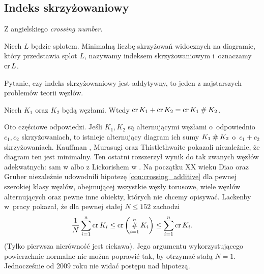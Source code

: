 \subsection{Indeks skrzyżowaniowy} %
\label{sub:crossing_number}
Z angielskiego \emph{crossing number}.

\begin{definition}
    Niech $L$ będzie splotem.
    Minimalną liczbę skrzyżowań widocznych na diagramie, który przedstawia splot $L$, nazywamy indeksem skrzyżowaniowym i~oznaczamy $\operatorname{cr} L$.
\end{definition}

Pytanie, czy indeks skrzyżowaniowy jest addytywny, to jeden z najstarszych problemów teorii węzłów.

\begin{conjecture}
    \label{con:crossing_additive}
    Niech $K_1$ oraz $K_2$ będą węzłami.
    Wtedy $\operatorname{cr} K_1 + \operatorname{cr} K_2 = \operatorname{cr} K_1 \mathbin{\#} K_2$.
\end{conjecture}

Oto częściowe odpowiedzi.
Jeśli $K_1, K_2$ są alternującymi węzłami o~odpowiednio $c_1, c_2$ skrzyżowaniach, to istnieje alternujący diagram ich sumy $K_1 \mathbin{\#} K_2$ o~$c_1 + c_2$ skrzyżowaniach.
Kauffman \cite[twierdzenie 2.10]{kauffman87}, Murasugi \cite[wniosek 6]{murasugi87} oraz Thistlethwaite \cite[wniosek 1]{thistlethwaite87} pokazali niezależnie, że diagram ten jest minimalny.
Ten ostatni rozszerzył wynik do tak zwanych węzłów adekwatnych: sam w \cite{thistlethwaite88} albo z Lickorishem w \cite{lickorish88}.
Na początku XX wieku Diao \cite{diao04} oraz Gruber \cite{gruber03} niezależnie udowodnili hipotezę \ref{con:crossing_additive} dla pewnej szerokiej klasy węzłów, obejmującej wszystkie węzły torusowe, wiele węzłów alternujących oraz pewne inne obiekty, których nie chcemy opisywać.
Lackenby w~pracy \cite{lackenby09} pokazał, że dla pewnej stałej $N \le 152$ zachodzi
\begin{equation}
    \frac 1 N \sum_{i=1}^n \operatorname{cr}{K_i} \le \operatorname{cr} \left(\operatorname*{\#}_{i=1}^n K_i\right) \le \sum_{i=1}^n \operatorname{cr}{K_i}.
\end{equation}
(Tylko pierwsza nierówność jest ciekawa).
Jego argumentu wykorzystującego powierzchnie normalne nie można poprawić tak, by otrzymać stałą $N = 1$.
Jednocześnie od 2009 roku nie widać postępu nad hipotezą.



